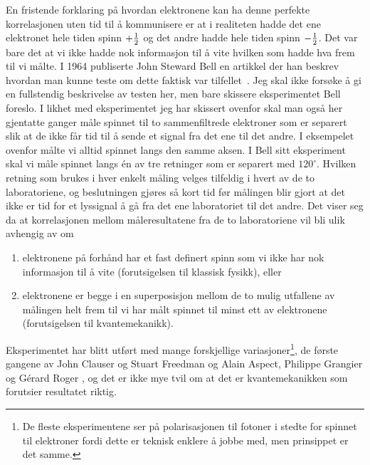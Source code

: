 En fristende forklaring på hvordan elektronene kan ha denne perfekte korrelasjonen uten tid til å kommunisere er at i realiteten hadde det ene elektronet hele tiden spinn $+\frac{1}{2}$ og det andre hadde hele tiden spinn $-\frac{1}{2}$. Det var bare det at vi ikke hadde nok informasjon til å vite hvilken som hadde hva frem til vi målte. I 1964 publiserte John Steward Bell en artikkel der han beskrev hvordan man kunne teste om dette faktisk var tilfellet~\cite{PhysicsPhysiqueFizika.1.195}. Jeg skal ikke forsøke å gi en fullstendig beskrivelse av testen her, men bare skissere eksperimentet Bell foreslo. I likhet med eksperimentet jeg har skissert ovenfor skal man også her gjentatte ganger måle spinnet til to sammenfiltrede elektroner som er separert slik at de ikke får tid til å sende et signal fra det ene til det andre. I eksempelet ovenfor målte vi alltid spinnet langs den samme aksen. I Bell sitt eksperiment skal vi måle spinnet langs \'en av tre retninger som er separert med $120^\circ$. Hvilken retning som brukes i hver enkelt måling velges tilfeldig i hvert av de to laboratoriene, og beslutningen gjøres så kort tid før målingen blir gjort at det ikke er tid for et lyssignal å gå fra det ene laboratoriet til det andre. Det viser seg da at korrelasjonen mellom måleresultatene fra de to laboratoriene vil bli ulik avhengig av om
\begin{enumerate}
\item
elektronene på forhånd har et fast definert spinn som vi ikke har nok informasjon til å vite (forutsigelsen til klassisk fysikk), eller
\item
elektronene er begge i en superposisjon mellom de to mulig utfallene av målingen helt frem til vi har målt spinnet til minst ett av elektronene (forutsigelsen til kvantemekanikk).
\end{enumerate}
Eksperimentet har blitt utført med mange forskjellige variasjoner\footnote{De fleste eksperimentene ser på polarisasjonen til fotoner i stedte for spinnet til elek\-troner fordi dette er teknisk enklere å jobbe med, men prinsippet er det samme.}, de første gangene av John Clauser og Stuart Freedman\cite{PhysRevLett.28.938} og Alain Aspect, Philippe Grangier og G\'erard Roger \cite{PhysRevLett.47.460}, og det er ikke mye tvil om at det er kvantemekanikken som forutsier resultatet riktig.